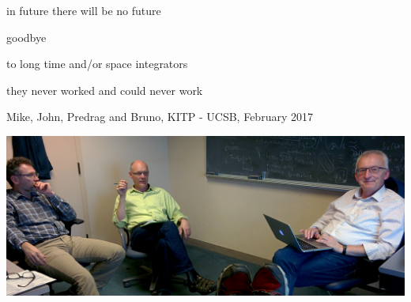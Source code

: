 \begin{frame}{in future there will be no future}
\begin{center}
{\huge goodbye}
\end{center}

\vfill

to long time and/or space integrators

\medskip

\hfill they never worked and could never work
\end{frame}

\begin{frame}{Mike, John, Predrag and Bruno, KITP - UCSB, February 2017}
\begin{center}
\hfill\includegraphics[width=1.00\textwidth]{20170208MikeJohnBruno}
\end{center}
\end{frame}


